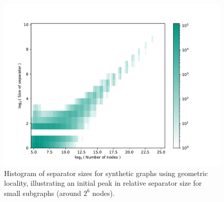 \begin{figure}[tbhp]
    \centering
    \includegraphics[width=0.6\linewidth]{graphics/local_embedding-hist.pdf}
    \caption{Histogram of separator sizes for synthetic graphs using geometric locality, illustrating an initial peak in relative separator size for small subgraphs (around \(2^6\) nodes).}
    \label{fig:local_embedding_hist_deviation}
\end{figure}




